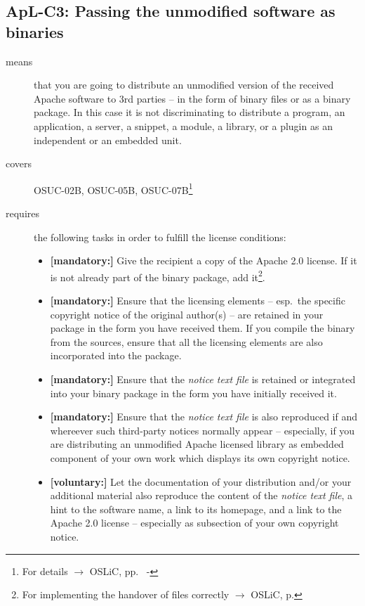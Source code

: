 \subsection{ApL-C3: Passing the unmodified software as binaries} 
\label{OSUC-02B-Apache20} \label{OSUC-05B-Apache20} \label{OSUC-07B-Apache20}

\begin{description}
\item[means] that you are going to distribute an unmodified version of the
received Apache software to 3rd parties -- in the form of binary files or as a
bi\-na\-ry package. In this case it is not discriminating to distribute a
program, an application, a server, a snippet, a module, a library,
or a plugin as an independent or an embedded unit.

\item[covers] OSUC-02B, OSUC-05B, OSUC-07B\footnote{For details $\rightarrow$
OSLiC, pp.\ \pageref{OSUC-02B-DEF} - \pageref{OSUC-07B-DEF}}

\item[requires] the following tasks in order to fulfill the license conditions:
\begin{itemize}
  \item \textbf{[mandatory:]} Give the recipient a copy of the Apache 2.0
  license. If it is not already part of the binary package, add
  it\footnote{For implementing the handover of files correctly $\rightarrow$
  OSLiC, p. \pageref{DistributingFilesHint}}.
  
  \item \textbf{[mandatory:]} Ensure that the licensing elements -- esp.\ the
  specific copyright notice of the original author(s) -- are retained in your
  package in the form you have received them. If you compile the binary from the
  sources, ensure that all the licensing elements are also incorporated into the
  package.
  \item \textbf{[mandatory:]} Ensure that the \emph{notice text file} is
  retained or integrated into your binary package in the form you have initially
  received
  it.
  \item \textbf{[mandatory:]} Ensure that the \emph{notice text file} is also
  reproduced if and whereever such third-party notices normally appear --
  especially, if you are distributing an unmodified Apache licensed library as
  embedded component of your own work which displays its own copyright notice.
  
  \item \textbf{[voluntary:]} Let the documentation of your distribution and/or
  your additional material also reproduce the content of the \emph{notice text
  file}, a hint to the software name, a link to its homepage, and a link to the
  Apache 2.0 license -- especially as subsection of your own copyright notice.
\end{itemize}


\end{description}
